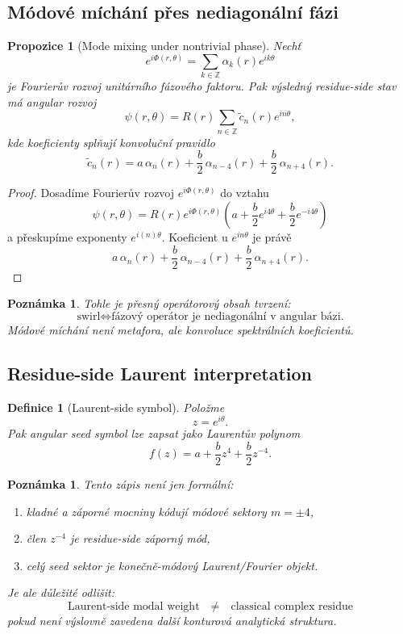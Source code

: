 \documentclass[11pt,a4paper]{article}
\newtheorem{definition}[theorem]{Definice}
\newtheorem{remark}[theorem]{Poznámka}
\newtheorem{proposition}[theorem]{Propozice}
\begin{document}
\subsection*{Módové míchání přes nediagonální fázi}

\begin{proposition}[Mode mixing under nontrivial phase]
Nechť
\[
e^{i\Phi(r,\theta)}=\sum_{k\in\mathbb Z}\alpha_k(r)e^{ik\theta}
\]
je Fourierův rozvoj unitárního fázového faktoru.
Pak výsledný residue-side stav má angular rozvoj
\[
\psi(r,\theta)
=
R(r)\sum_{n\in\mathbb Z}\widetilde c_n(r)e^{in\theta},
\]
kde koeficienty splňují konvoluční pravidlo
\[
\widetilde c_n(r)
=
a\,\alpha_n(r)+\frac b2\,\alpha_{n-4}(r)+\frac b2\,\alpha_{n+4}(r).
\]
\end{proposition}

\begin{proof}
Dosadíme Fourierův rozvoj \(e^{i\Phi(r,\theta)}\) do vztahu
\[
\psi(r,\theta)=
R(r)e^{i\Phi(r,\theta)}
\left(a+\frac b2 e^{i4\theta}+\frac b2 e^{-i4\theta}\right)
\]
a přeskupíme exponenty \(e^{i(n)\theta}\).
Koeficient u \(e^{in\theta}\) je právě
\[
a\,\alpha_n(r)+\frac b2\,\alpha_{n-4}(r)+\frac b2\,\alpha_{n+4}(r).
\]
\end{proof}

\begin{remark}
Tohle je přesný operátorový obsah tvrzení:
\[
\text{swirl} \Longleftrightarrow \text{fázový operátor je nediagonální v angular bázi.}
\]
Módové míchání není metafora, ale konvoluce spektrálních koeficientů.
\end{remark}

\subsection*{Residue-side Laurent interpretation}

\begin{definition}[Laurent-side symbol]
Položme
\[
z=e^{i\theta}.
\]
Pak angular seed symbol lze zapsat jako Laurentův polynom
\[
f(z)=a+\frac b2 z^4+\frac b2 z^{-4}.
\]
\end{definition}

\begin{remark}
Tento zápis není jen formální:
\begin{enumerate}[label=\textbf{(\arabic*)}]
    \item kladné a záporné mocniny kódují módové sektory \(m=\pm4\),
    \item člen \(z^{-4}\) je residue-side záporný mód,
    \item celý seed sektor je konečně-módový Laurent/Fourier objekt.
\end{enumerate}
Je ale důležité odlišit:
\[
\text{Laurent-side modal weight}
\quad\neq\quad
\text{classical complex residue}
\]
pokud není výslovně zavedena další konturová analytická struktura.
\end{remark}
\end{document}
